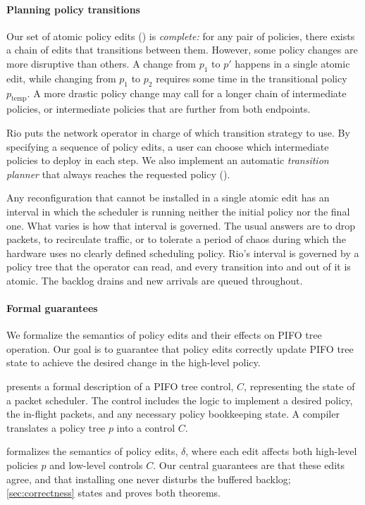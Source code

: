 \documentclass[sigplan,anonymous,review,nonacm]{acmart}
\begin{document}
\paragraph{Planning policy transitions}

Our set of atomic policy edits () is \emph{complete:}
for any pair of policies, there exists a chain of edits that transitions between them.
However, some policy changes are more disruptive than others.
A change from $p_1$ to $p'$ happens in a single atomic edit, while
changing from $p_1$ to $p_2$ requires some time in the transitional policy $p_\text{temp}$.
A more drastic policy change may call for a longer chain of intermediate policies, or intermediate policies that are further from both endpoints.

Rio puts the network operator in charge of which transition strategy to use.
By specifying a sequence of policy edits, a user can choose which intermediate policies to deploy in each step.
We also implement an automatic \emph{transition planner} that always reaches the requested policy ().

Any reconfiguration that cannot be installed in a single atomic edit has an interval in which the scheduler is running neither the initial policy nor the final one.
What varies is how that interval is governed.
The usual answers are to drop packets, to recirculate traffic, or to tolerate a period of chaos during which the hardware uses no clearly defined scheduling policy.
Rio's interval is governed by a policy tree that the operator can read, and every transition into and out of it is atomic.
The backlog drains and new arrivals are queued throughout.

\paragraph{Formal guarantees}
We formalize the semantics of policy edits and their effects on PIFO tree operation.
Our goal is to guarantee that policy edits correctly update PIFO tree state to achieve the desired change in the high-level policy.

 presents a formal description of a PIFO tree control, $C$, representing the state of a packet scheduler.
The control includes the logic to implement a desired policy,
the in-flight packets,
and any necessary policy bookkeeping state.
A compiler translates a policy tree $p$ into a control $C$.

 formalizes the semantics of policy edits, $\delta$, where each edit affects both high-level policies $p$ and low-level controls $C$.
Our central guarantees are that these edits agree, and that installing one never disturbs the buffered backlog; \cref{sec:correctness} states and proves both theorems.
\end{document}

